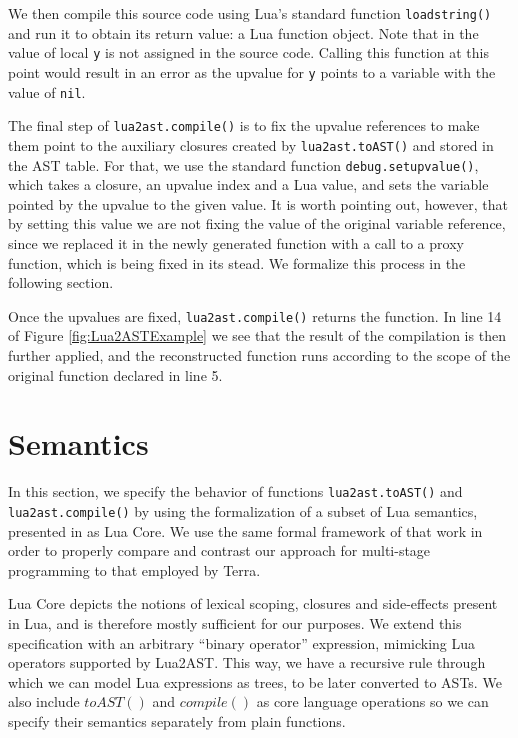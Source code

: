 \documentclass[english]{llncs}
\begin{document}
We then compile this source code using Lua's standard function
\texttt{loadstring()} and run it to obtain its return value: a Lua function object.
Note that in the value of local \texttt{y} is not assigned
in the source code. Calling this function at this point would result
in an error as the upvalue for \texttt{y} points to a variable with
the value of \texttt{nil}.

The final step of \texttt{lua2ast.compile()} is to fix the upvalue
references to make them point to the auxiliary closures created by
\texttt{lua2ast.toAST()} and stored in the AST table.
For that, we use the standard function \texttt{debug.setupvalue()},
which takes a closure, an upvalue index and a Lua value, and sets
the variable pointed by the upvalue to the given value.
It is worth pointing out, however, that by setting this value we are not fixing the value
of the original variable reference, since we replaced it in the newly generated function
with a call to a proxy function, which is being fixed in its stead.
We formalize this process in the following section.

Once the upvalues are fixed, \texttt{lua2ast.compile()} returns the
function. In line 14 of Figure \ref{fig:Lua2ASTExample} we see
that the result of the compilation is then further applied,
and the reconstructed function runs according to the scope of the
original function declared in line 5.

\section{Semantics}
\label{sec:semantics}

In this section, we specify the behavior of functions \texttt{lua2ast.toAST()}
and \texttt{lua2ast.compile()} by using the formalization of a subset
of Lua semantics, presented in \cite{DeVito2013Terra} as Lua Core.
We use the same formal framework of that work in order to properly
compare and contrast our approach for multi-stage programming to that
employed by Terra.

Lua Core depicts the notions of lexical scoping, closures and side-effects
present in Lua, and is therefore mostly sufficient for our purposes.
We extend this specification with an arbitrary ``binary operator''
expression, mimicking Lua operators supported by Lua2AST. This way,
we have a recursive rule through which we can model Lua expressions
as trees, to be later converted to ASTs. We also include $toAST()$ and
$compile()$ as core language operations so we can specify their semantics
separately from plain functions.
\end{document}
